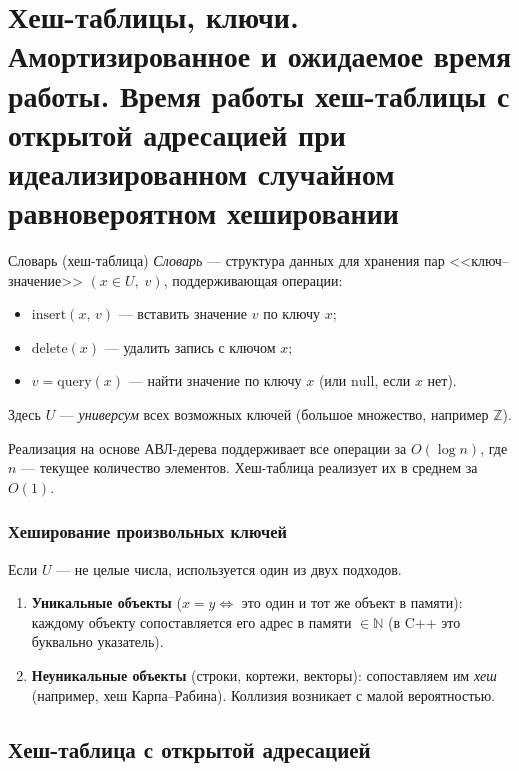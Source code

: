
\section{Хеш-таблицы, ключи. Амортизированное и ожидаемое время работы. Время работы хеш-таблицы с открытой адресацией при идеализированном случайном равновероятном хешировании}

\begin{Definition}{Словарь (хеш-таблица)}{}
	\emph{Словарь} --- структура данных для хранения пар <<ключ--значение>> $(x \in U,\; v)$, поддерживающая операции:
	\begin{itemize}
		\item $\mathrm{insert}(x,\,v)$ --- вставить значение $v$ по ключу $x$;
		\item $\mathrm{delete}(x)$ --- удалить запись с ключом $x$;
		\item $v = \mathrm{query}(x)$ --- найти значение по ключу $x$ (или $\mathrm{null}$, если $x$ нет).
	\end{itemize}
	Здесь $U$ --- \emph{универсум} всех возможных ключей (большое множество, например $\mathbb{Z}$).
\end{Definition}

\begin{Remark}{}{}
	Реализация на основе АВЛ-дерева поддерживает все операции за $O(\log n)$, где $n$ --- текущее количество элементов. Хеш-таблица реализует их в среднем за $O(1)$.
\end{Remark}

\subsubsection*{Хеширование произвольных ключей}

Если $U$ --- не целые числа, используется один из двух подходов.
\begin{enumerate}
	\item \textbf{Уникальные объекты} ($x = y \Leftrightarrow$ это один и тот же объект в памяти): каждому объекту сопоставляется его адрес в памяти $\in \mathbb{N}$ (в C++ это буквально указатель).
	\item \textbf{Неуникальные объекты} (строки, кортежи, векторы): сопоставляем им \emph{хеш} (например, хеш Карпа--Рабина). Коллизия возникает с малой вероятностью.
\end{enumerate}

\subsection{Хеш-таблица с открытой адресацией}

